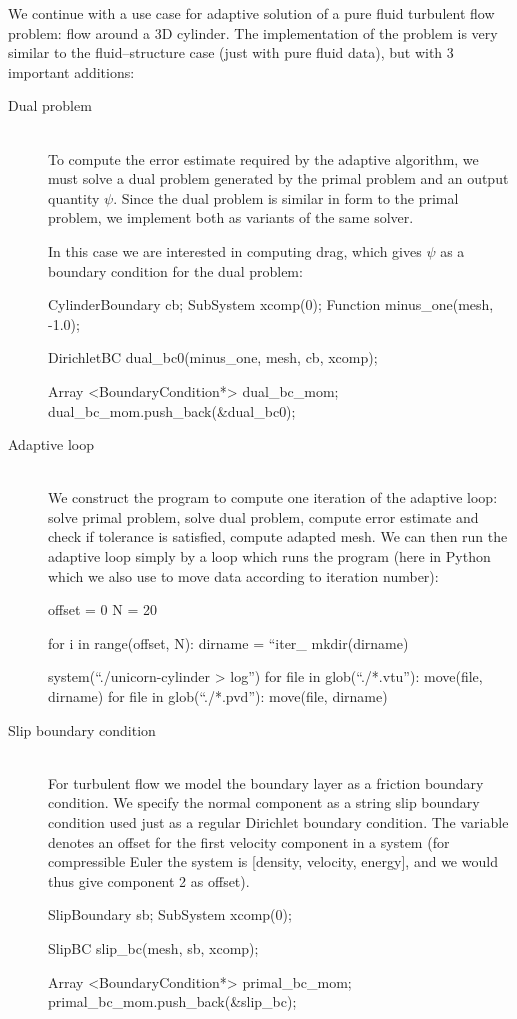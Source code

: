 We continue with a use case for adaptive solution of a pure fluid
turbulent flow problem: flow around a 3D cylinder. The implementation
of the problem is very similar to the fluid--structure case (just with
pure fluid data), but with 3 important additions:
\begin{description}
\item[Dual problem]
\ \\
To compute the error estimate required by the adaptive algorithm, we
must solve a dual problem generated by the primal problem and an
output quantity $\psi$. Since the dual problem is similar in form to
the primal problem, we implement both as variants of the same solver.

In this case we are interested in computing drag, which gives $\psi$
as a boundary condition for the dual problem:

\begin{c++}
CylinderBoundary cb;
SubSystem xcomp(0);
Function minus_one(mesh, -1.0);

DirichletBC dual_bc0(minus_one, mesh, cb, xcomp);

Array <BoundaryCondition*> dual_bc_mom;
dual_bc_mom.push_back(&dual_bc0);
\end{c++}


\item[Adaptive loop]
\ \\
We construct the program to compute one iteration of the adaptive
loop: solve primal problem, solve dual problem, compute error estimate
and check if tolerance is satisfied, compute adapted mesh. We can then
run the adaptive loop simply by a loop which runs the program (here in
Python which we also use to move data according to iteration number):
\begin{python}
offset = 0
N = 20

for i in range(offset, N):
    dirname = ``iter_%
    mkdir(dirname)

    system(``./unicorn-cylinder > log'')
    for file in glob(``./*.vtu''):
    move(file, dirname)
    for file in glob(``./*.pvd''):
    move(file, dirname)
\end{python}


\item[Slip boundary condition]
\ \\
For turbulent flow we model the boundary layer as a friction boundary
condition. We specify the normal component as a string slip boundary
condition used just as a regular Dirichlet boundary condition. The
 variable denotes an offset for the first velocity
component in a system (for compressible Euler the system is [density,
velocity, energy], and we would thus give component 2 as offset).
\begin{c++}
SlipBoundary sb;
SubSystem xcomp(0);

SlipBC slip_bc(mesh, sb, xcomp);

Array <BoundaryCondition*> primal_bc_mom;
primal_bc_mom.push_back(&slip_bc);
\end{c++}

\end{description}

